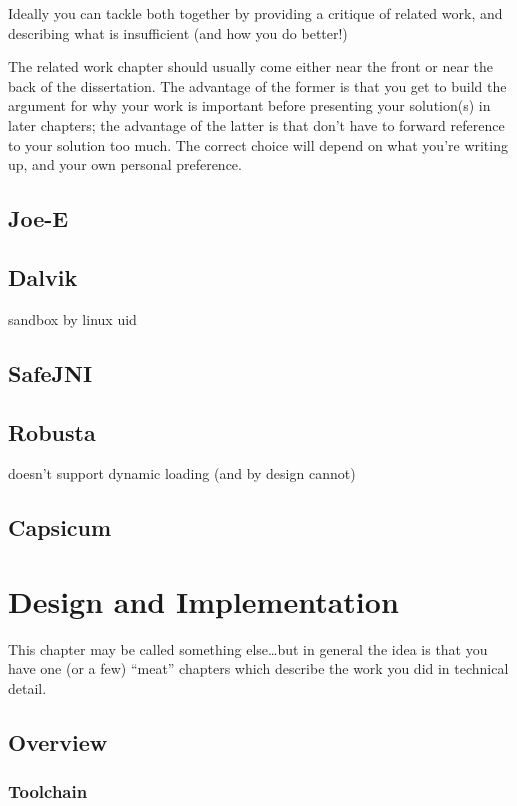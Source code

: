 \documentclass[a4paper,12pt,twoside,openright]{report}
\begin{document}
Ideally you can tackle both together by providing a critique of
related work, and describing what is insufficient (and how you do
better!)

The related work chapter should usually come either near the front or
near the back of the dissertation. The advantage of the former is that
you get to build the argument for why your work is important before
presenting your solution(s) in later chapters; the advantage of the
latter is that don't have to forward reference to your solution too
much. The correct choice will depend on what you're writing up, and
your own personal preference.

\section{Joe-E}

\section{Dalvik}

sandbox by linux uid

\section{SafeJNI}

\section{Robusta}

doesn't support dynamic loading (and by design cannot)

\section{Capsicum}

\chapter{Design and Implementation} 

This chapter may be called something else\ldots but in general 
the idea is that you have one (or a few) ``meat'' chapters which
describe the work you did in technical detail. 

\section{Overview}

\subsection{Toolchain}
\end{document}
